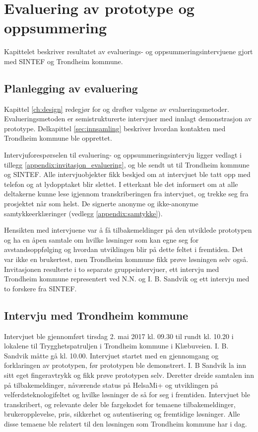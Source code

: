 \chapter{Evaluering av prototype og oppsummering}
\label{ch:evaluation1}
Kapittelet beskriver resultatet av evaluerings- og oppsummeringsintervjuene gjort med SINTEF og Trondheim kommune.

\section{Planlegging av evaluering}
Kapittel \ref{ch:design} redegjør for og drøfter valgene av evalueringsmetoder.
Evalueringsmetoden er semistrukturerte intervjuer med innlagt demonstrasjon av prototype. Delkapittel \ref{sec:innsamling}
beskriver hvordan kontakten med Trondheim kommune ble opprettet.

Intervjuforespørselen til evaluering- og oppsummeringsintervju ligger vedlagt i tillegg \ref{appendix:invitasjon_evaluering},
og ble sendt ut til Trondheim kommune og SINTEF. Alle intervjuobjekter fikk beskjed
om at intervjuet ble tatt opp med telefon og at lydopptaket blir slettet. I etterkant ble det informert om at alle deltakerne
kunne lese igjennom transkriberingen fra intervjuet, og trekke seg fra prosjektet når som helst. De signerte anonyme og ikke-anonyme
samtykkeerklæringer (vedlegg \ref{appendix:samtykke}).

Hensikten med intervjuene var å få tilbakemeldinger
på den utviklede prototypen og ha en åpen samtale om hvilke løsninger som kan egne seg for avstandsoppfølging og hvordan utviklingen blir
på dette feltet i fremtiden. Det var ikke en brukertest, men Trondheim kommune fikk prøve løsningen selv også.
Invitasjonen resulterte i to separate gruppeintervjuer, ett intervju med Trondheim kommune representert ved
N.N. og I. B. Sandvik og ett intervju med to forskere fra SINTEF.

\section{Intervju med Trondheim
kommune}\label{intervju-med-trondheim-kommune}
Intervjuet ble gjennomført tirsdag 2. mai 2017 kl. 09.30 til rundt kl. 10.20 i lokalene til Trygghetspatruljen i Trondheim kommune
i Klæbuveien. I. B. Sandvik måtte gå kl. 10.00. Intervjuet startet med en gjennomgang og forklaringen av prototypen, før prototypen
ble demonstrert. I. B Sandvik la inn sitt eget fingeravtrykk og fikk prøve prototypen selv. Deretter dreide samtalen inn på tilbakemeldinger,
nåværende status på HelsaMi+ og utviklingen på velferdsteknologifeltet og hvilke løsninger de så for seg i fremtiden. Intervjuet ble transkribert,
og relevante deler ble fargekodet for temaene tilbakemeldinger, brukeropplevelse, pris, sikkerhet og autentisering og fremtidige løsninger.
Alle disse temaene ble relatert til den løsningen som Trondheim kommune har i dag.

